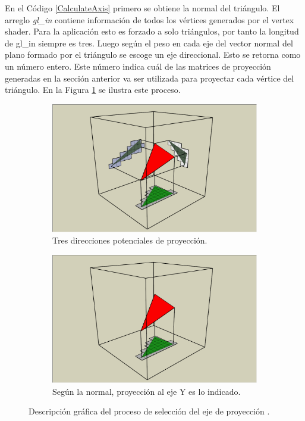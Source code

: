 En el Código \ref{CalculateAxis} primero se obtiene la normal del triángulo. El arreglo \emph{gl\_in} contiene información de todos los vértices generados por el vertex shader. Para la aplicación esto es forzado a solo triángulos, por tanto la longitud de gl\_in siempre es tres. Luego según el peso en cada eje del vector normal del plano formado por el triángulo se escoge un eje direccional. Esto se retorna como un número entero. Este número indica cuál de las matrices de proyección generadas en la sección anterior va ser utilizada para proyectar cada vértice del triángulo. En la Figura \ref{fig:axis_selection} se ilustra este proceso.

\begin{figure}[H]
	\centering
	\begin{subfigure}[t]{.49\linewidth}
		\centering
		\captionsetup{justification=centering}
		\includegraphics[width=\linewidth]{media/Voxelization_blog_fig_5.png}
		\caption*{Tres direcciones potenciales de proyección.}
	\end{subfigure}%
	\hspace{0.01\textwidth}
	\begin{subfigure}[t]{.49\linewidth}
		\centering
		\captionsetup{justification=centering}
		\includegraphics[width=\linewidth]{media/Voxelization_blog_fig_6.png}
		\caption*{Según la normal, proyección al eje Y es lo indicado.}
	\end{subfigure}%
	\caption{Descripción gráfica del proceso de selección del eje de proyección \cite{gpuvoxelization}.}
	\label{fig:axis_selection}
\end{figure}

